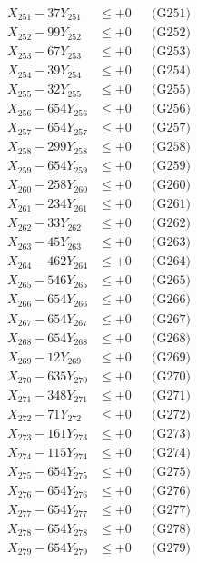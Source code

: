 \documentclass[a4paper,10pt]{article}
\begin{document}
{\begin{align}
\allowbreak
X_{251} - 37Y_{251} &\leq +0 && \text{(G251)} \\
X_{252} - 99Y_{252} &\leq +0 && \text{(G252)} \\
X_{253} - 67Y_{253} &\leq +0 && \text{(G253)} \\
X_{254} - 39Y_{254} &\leq +0 && \text{(G254)} \\
X_{255} - 32Y_{255} &\leq +0 && \text{(G255)} \\
X_{256} - 654Y_{256} &\leq +0 && \text{(G256)} \\
X_{257} - 654Y_{257} &\leq +0 && \text{(G257)} \\
X_{258} - 299Y_{258} &\leq +0 && \text{(G258)} \\
X_{259} - 654Y_{259} &\leq +0 && \text{(G259)} \\
X_{260} - 258Y_{260} &\leq +0 && \text{(G260)} \\
\allowbreak
X_{261} - 234Y_{261} &\leq +0 && \text{(G261)} \\
X_{262} - 33Y_{262} &\leq +0 && \text{(G262)} \\
X_{263} - 45Y_{263} &\leq +0 && \text{(G263)} \\
X_{264} - 462Y_{264} &\leq +0 && \text{(G264)} \\
X_{265} - 546Y_{265} &\leq +0 && \text{(G265)} \\
X_{266} - 654Y_{266} &\leq +0 && \text{(G266)} \\
X_{267} - 654Y_{267} &\leq +0 && \text{(G267)} \\
X_{268} - 654Y_{268} &\leq +0 && \text{(G268)} \\
X_{269} - 12Y_{269} &\leq +0 && \text{(G269)} \\
X_{270} - 635Y_{270} &\leq +0 && \text{(G270)} \\
\allowbreak
X_{271} - 348Y_{271} &\leq +0 && \text{(G271)} \\
X_{272} - 71Y_{272} &\leq +0 && \text{(G272)} \\
X_{273} - 161Y_{273} &\leq +0 && \text{(G273)} \\
X_{274} - 115Y_{274} &\leq +0 && \text{(G274)} \\
X_{275} - 654Y_{275} &\leq +0 && \text{(G275)} \\
X_{276} - 654Y_{276} &\leq +0 && \text{(G276)} \\
X_{277} - 654Y_{277} &\leq +0 && \text{(G277)} \\
X_{278} - 654Y_{278} &\leq +0 && \text{(G278)} \\
X_{279} - 654Y_{279} &\leq +0 && \text{(G279)} \\

\end{align}}
\end{document}
